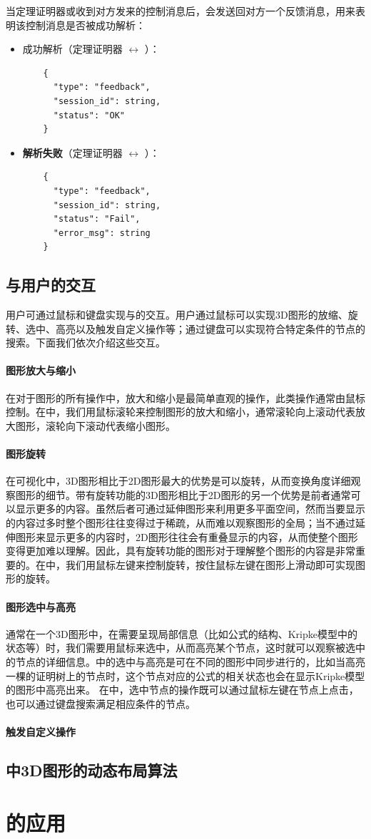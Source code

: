 当定理证明器或收到对方发来的控制消息后，会发送回对方一个反馈消息，用来表明该控制消息是否被成功解析：
\begin{itemize}
	\item \textsf{成功解析}（定理证明器 $\longleftrightarrow$ ）：
	\begin{verbatim}
	{
	  "type": "feedback",
	  "session_id": string,
	  "status": "OK"
	}
	\end{verbatim}
	\item \textbf{解析失败}（定理证明器 $\longleftrightarrow$ ）：
	\begin{verbatim}
	{
	  "type": "feedback",
	  "session_id": string,
	  "status": "Fail",
	  "error_msg": string
	}
	\end{verbatim}
\end{itemize}
\subsection{与用户的交互}
用户可通过鼠标和键盘实现与的交互。用户通过鼠标可以实现3D图形的放缩、旋转、选中、高亮以及触发自定义操作等；通过键盘可以实现符合特定条件的节点的搜索。下面我们依次介绍这些交互。
\paragraph{图形放大与缩小}
在对于图形的所有操作中，放大和缩小是最简单直观的操作，此类操作通常由鼠标控制。在中，我们用鼠标滚轮来控制图形的放大和缩小，通常滚轮向上滚动代表放大图形，滚轮向下滚动代表缩小图形。
\paragraph{图形旋转}
在可视化中，3D图形相比于2D图形最大的优势是可以旋转，从而变换角度详细观察图形的细节。带有旋转功能的3D图形相比于2D图形的另一个优势是前者通常可以显示更多的内容。虽然后者可通过延伸图形来利用更多平面空间，然而当要显示的内容过多时整个图形往往变得过于稀疏，从而难以观察图形的全局；当不通过延伸图形来显示更多的内容时，2D图形往往会有重叠显示的内容，从而使整个图形变得更加难以理解。因此，具有旋转功能的图形对于理解整个图形的内容是非常重要的。在中，我们用鼠标左键来控制旋转，按住鼠标左键在图形上滑动即可实现图形的旋转。
\paragraph{图形选中与高亮}
通常在一个3D图形中，在需要呈现局部信息（比如公式的结构、Kripke模型中的状态等）时，我们需要用鼠标来选中，从而高亮某个节点，这时就可以观察被选中的节点的详细信息。中的选中与高亮是可在不同的图形中同步进行的，比如当高亮一棵\sctlprov{}的证明树上的节点时，这个节点对应的公式的相关状态也会在显示Kripke模型的图形中高亮出来。 在中，选中节点的操作既可以通过鼠标左键在节点上点击，也可以通过键盘搜索满足相应条件的节点。
\paragraph{触发自定义操作}



\subsection{中3D图形的动态布局算法}

\section{的应用}


